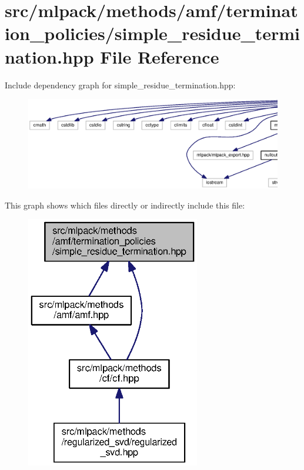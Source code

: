 \section{src/mlpack/methods/amf/termination\+\_\+policies/simple\+\_\+residue\+\_\+termination.hpp File Reference}
\label{simple__residue__termination_8hpp}
Include dependency graph for simple\+\_\+residue\+\_\+termination.\+hpp\+:
\nopagebreak
\begin{figure}[H]
\begin{center}
\leavevmode
\includegraphics[width=350pt]{simple__residue__termination_8hpp__incl}
\end{center}
\end{figure}
This graph shows which files directly or indirectly include this file\+:
\nopagebreak
\begin{figure}[H]
\begin{center}
\leavevmode
\includegraphics[width=215pt]{simple__residue__termination_8hpp__dep__incl}
\end{center}
\end{figure}
